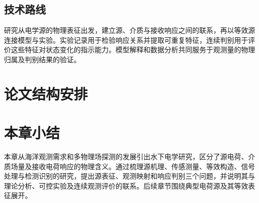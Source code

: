 \subsection{技术路线}

研究从电学源的物理表征出发，建立源、介质与接收响应之间的联系，再以等效源连接模型与实验。实验记录用于检验响应关系并提取可重复特征，连续判别用于评价这些特征对状态变化的指示能力。模型解释和数据分析共同服务于观测量的物理归属及判别结果的验证。

\section{论文结构安排}

\section{本章小结}

本章从海洋观测需求和多物理场探测的发展引出水下电学研究，区分了源电荷、介质场量及接收电荷响应的物理含义。通过梳理源机理、传感测量、等效构造、信号处理与检测识别的研究，提出源表征、观测映射和响应判别三个问题，并说明其与理论分析、可控实验及连续观测评价的联系。后续章节围绕典型电荷源及其等效表征展开。
